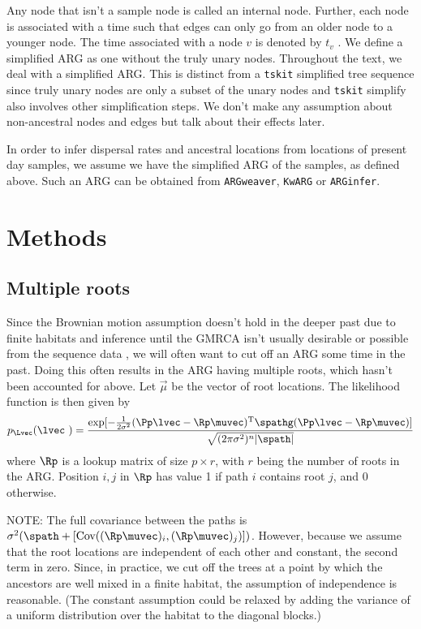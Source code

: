 Any node that isn't a sample node is called an internal node. Further, each node is associated with a time such that edges can only go from an older node to a younger node. The time associated with a node $v$ is denoted by $t_v$ . We define a simplified ARG as one without the truly unary nodes. Throughout the text, we deal with a simplified ARG. This is distinct from a {\tt tskit} simplified tree sequence since truly unary nodes are only a subset of the unary nodes and {\tt tskit} simplify also involves other simplification steps. We don't make any assumption about non-ancestral nodes and edges but talk about their effects later. 



In order to infer dispersal rates and ancestral locations from locations of present day samples, we assume we have the simplified ARG of the samples, as defined above.  Such an ARG can be obtained from {\tt ARGweaver}, {\tt KwARG} or {\tt ARGinfer}.



\section{Methods}

\subsection{Multiple roots}

Since the Brownian motion assumption doesn't hold in the deeper past due to finite habitats \citep{Ianni2022, WakeleySCATTERINGETC} and inference until the GMRCA isn't usually desirable or possible from the sequence data \cite{}, we will often want to cut off an ARG some time in the past. 
Doing this often results in the ARG having multiple roots, which hasn't been accounted for above. Let $\vec{\mu}$ be the vector of root locations. The likelihood function is then given by 
\begin{eqnarray}
    p_{\Lvec}(\lvec \ ) = \frac{ \text{exp} [ -\frac{1}{2\sigma^2} (\Pp\lvec - \Rp\muvec)^\text{T} \spathg (\Pp\lvec - \Rp\muvec) ] }{\sqrt{ (2\pi\sigma^2)^n |\spath|  }}
\end{eqnarray}
where $\Rp$ is a lookup matrix of size $p \times r$, with $r$ being the number of roots in the ARG. Position $i,j$ in $\Rp$ has value 1 if path $i$ contains root $j$, and 0 otherwise. 

NOTE: The full covariance between the paths is $\sigma^2 ( \spath + [ \text{Cov}( (\Rp\muvec)_i, (\Rp\muvec)_j ) ] )$. However, because we assume that the root locations are independent of each other and constant, the second term in zero. Since, in practice, we cut off the trees at a point by which the ancestors are well mixed in a finite habitat, the assumption of independence is reasonable. (The constant assumption could be relaxed by adding the variance of a uniform distribution over the habitat to the diagonal blocks.) 

